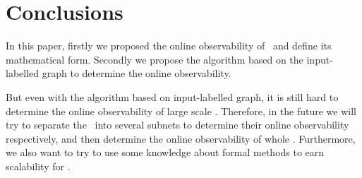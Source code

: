 \section{Conclusions}
\label{sec:con}
In this paper, firstly we proposed the online observability of \BCNs\ and define its mathematical form. Secondly we propose the algorithm based on the input-labelled graph to determine the online observability. 


But even with the algorithm based on input-labelled graph, it is still hard to determine the online observability of large scale \BCNs. Therefore, in the future we will try to separate the \BCN\ into several subnets to determine their online observability respectively, and then determine the online observability of whole \BCN. Furthermore, we also want to try to use some knowledge about formal methods to earn scalability for \BCNs. 

